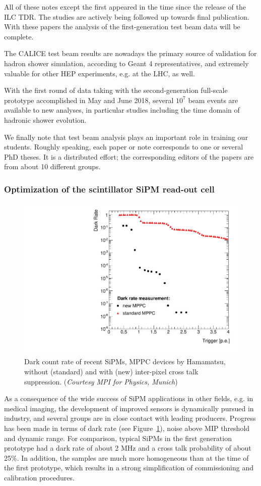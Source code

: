 All of these notes except the first appeared in the time since the release of the ILC TDR. The studies are actively being followed up towards final publication. With these papers the analysis of the first-generation test beam data will be complete.

The CALICE test beam results are nowadays the primary source of validation for hadron shower simulation, according to Geant 4 representatives, and extremely valuable for other HEP experiments, e.g. at the LHC, as well.

With the first round of data taking with the second-generation full-scale prototype accomplished in May and June 2018, several $10^7$ beam events are available to new analyses, in particular studies including the time domain of hadronic shower evolution.

We finally note that test beam analysis plays an important role in training our students. Roughly speaking, each paper or note corresponds to one or several PhD theses. It is a distributed effort; the corresponding editors of the papers are from about 10 different groups.

\subsubsection{Optimization of the scintillator SiPM read-out cell}
\label{sec:OptimizationSiPMRO}

\begin{figure}
	\centering
	\includegraphics[width=.5\linewidth]{Calorimeter/AHCAL/DarkCount}
	\caption{Dark count rate of recent SiPMs, MPPC devices by Hamamatsu, without (standard) and with (new) inter-pixel cross talk suppression. ({\it Courtesy MPI for Physics, Munich})}
	\label{fig:Calorimeter:AHCAL:DarkCount}
\end{figure}

As a consequence of the wide success of SiPM applications in other fields, e.g. in medical imaging, the development of improved sensors is dynamically pursued in industry, and several groups are in close contact with leading producers. Progress has been made in terms of dark rate (see Figure~\ref{fig:Calorimeter:AHCAL:DarkCount}), noise above MIP threshold and dynamic range. For comparison, typical SiPMs in the first generation prototype had a dark rate of about 2 MHz and a cross talk probability of about 25\%. In addition, the samples are much more homogeneous than at the time of the first prototype, which results in a strong simplification of commissioning and calibration procedures.

